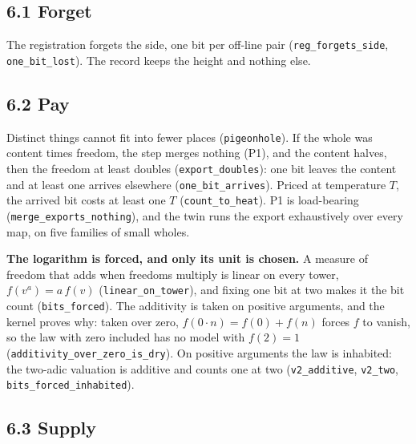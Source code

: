 \documentclass[10pt,twocolumn]{article}
\begin{document}
\hypertarget{forget}{%
\subsection{6.1 Forget}\label{forget}}

The registration forgets the side, one bit per off-line pair
(\texttt{reg\_\allowbreak{}forgets\_\allowbreak{}side}, \texttt{one\_\allowbreak{}bit\_\allowbreak{}lost}). The record keeps
the height and nothing else.

\hypertarget{pay}{%
\subsection{6.2 Pay}\label{pay}}

Distinct things cannot fit into fewer places (\texttt{pigeonhole}). If
the whole was content times freedom, the step merges nothing (P1), and
the content halves, then the freedom at least doubles
(\texttt{export\_\allowbreak{}doubles}): one bit leaves the content and at least one
arrives elsewhere (\texttt{one\_\allowbreak{}bit\_\allowbreak{}arrives}). Priced at temperature
\(T\), the arrived bit costs at least one \(T\)
(\texttt{count\_\allowbreak{}to\_\allowbreak{}heat}). P1 is load-bearing
(\texttt{merge\_\allowbreak{}exports\_\allowbreak{}nothing}), and the twin runs the export
exhaustively over every map, on five families of small wholes.

\textbf{The logarithm is forced, and only its unit is chosen.} A measure
of freedom that adds when freedoms multiply is linear on every tower,
\(f(v^a)=a\,f(v)\) (\texttt{linear\_\allowbreak{}on\_\allowbreak{}tower}), and fixing one bit at
two makes it the bit count (\texttt{bits\_\allowbreak{}forced}). The additivity is
taken on positive arguments, and the kernel proves why: taken over zero,
\(f(0\cdot n)=f(0)+f(n)\) forces \(f\) to vanish, so the law with zero
included has no model with \(f(2)=1\)
(\texttt{additivity\_\allowbreak{}over\_\allowbreak{}zero\_\allowbreak{}is\_\allowbreak{}dry}). On positive arguments the
law is inhabited: the two-adic valuation is additive and counts one at
two (\texttt{v2\_\allowbreak{}additive}, \texttt{v2\_\allowbreak{}two},
\texttt{bits\_\allowbreak{}forced\_\allowbreak{}inhabited}).

\hypertarget{supply}{%
\subsection{6.3 Supply}\label{supply}}
\end{document}
